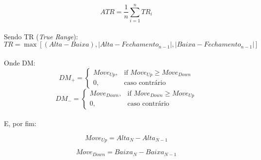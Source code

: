 \documentclass[grad,numbers]{coppe}
\begin{document}
            \begin{equation}
                ATR = \frac{1}{n} \sum_{i=1}^n TR_i
            \end{equation}
            
            \paragraph{}Sendo TR (\textit{True Range}):
            \begin{equation}
                TR = \max[(Alta - Baixa), |Alta - Fechamento_{n-1}|, |Baixa - Fechamento_{n-1}|]
            \end{equation}
            
            \paragraph{}Onde DM:
             \begin{equation}
                 DM_{+} = 
                \begin{cases}
                    Move_{Up},& \text{if } Move_{Up}\geq Move_{Down}\\
                    0,              & \text{caso contrário}
                \end{cases}
             \end{equation}
             \begin{equation}
                 DM_{-} = 
                \begin{cases}
                    Move_{Down},& \text{if } Move_{Down}\geq Move_{Up}\\
                    0,              & \text{caso contrário}
                \end{cases}
             \end{equation}
             
             \paragraph{}E, por fim:
             
             \begin{equation}
                 Move_{Up} = Alta_{N} - Alta_{N-1}
             \end{equation}
             
             \begin{equation}
                 Move_{Down} = Baixa_{N} - Baixa_{N-1}
             \end{equation}
             
\end{document}
